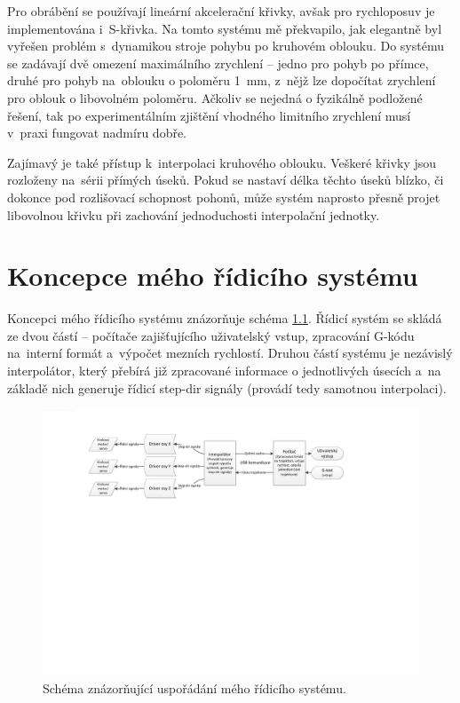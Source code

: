 		Pro obrábění se používají lineární akcelerační křivky, avšak pro rychloposuv je implementována i~S-křivka. Na tomto systému mě překvapilo, jak elegantně byl vyřešen problém s~dynamikou stroje pohybu po kruhovém oblouku. Do systému se zadávají dvě omezení maximálního zrychlení -- jedno pro pohyb po přímce, druhé pro pohyb na~oblouku o poloměru 1~mm, z~nějž lze dopočítat zrychlení pro oblouk o libovolném poloměru. Ačkoliv se nejedná o fyzikálně podložené řešení, tak po experimentálním zjištění vhodného limitního zrychlení musí v~praxi fungovat nadmíru dobře.
		
		Zajímavý je také přístup k~interpolaci kruhového oblouku. Veškeré křivky jsou rozloženy na~sérii přímých úseků. Pokud se nastaví délka těchto úseků blízko, či dokonce pod rozlišovací schopnost pohonů, může systém naprosto přesně projet libovolnou křivku při zachování jednoduchosti interpolační jednotky.
		
\chapter{Koncepce mého řídicího systému}

	Koncepci mého řídicího systému znázorňuje schéma \ref{nak:muj}. Řídicí systém se skládá ze dvou částí -- počítače zajišťujícího uživatelský vstup, zpracování G-kódu na~interní formát a~výpočet mezních rychlostí. Druhou částí systému je nezávislý interpolátor, který přebírá již zpracované informace o jednotlivých úsecích a~na základě nich generuje řídicí step-dir signály (provádí tedy samotnou interpolaci).

	\begin{figure}[h]
		\centering
		\includegraphics[width=1\textwidth]{img/mujsystem.pdf}
		\caption{Schéma znázorňující uspořádání mého řídicího systému.}\label{nak:muj}	
	\end{figure}
	
